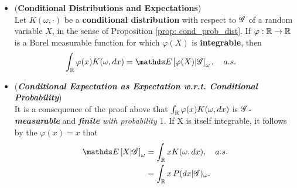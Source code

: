 \documentclass[11pt]{article}
\begin{document}
\begin{itemize}
\item \begin{proposition} (\textbf{Conditional Distributions and Expectations}) \citep{billingsley2008probability}\\
Let $K(\omega, \cdot)$ be a \textbf{conditional distribution} with respect to ${\mathscr G}$ of a random variable $X$, in the sense of Proposition \ref{prop: cond_prob_dist}. If $\varphi: {\mathbb R} \rightarrow {\mathbb R}$ is a Borel measurable function for which $\varphi(X)$ is \textbf{integrable}, then 
\begin{align*}
\int_{\bR} \varphi(x) K(\omega, dx) &= \E{}{\varphi(X) | \srG}_{\omega}, \quad a.s.
\end{align*}
\end{proposition}

\item \begin{remark} (\emph{\textbf{Conditional Expectation as Expectation w.r.t. Conditional Probability}})\\
It is a consequence of the proof above that $\int_{{\mathbb R}} \varphi(x) K(\omega, dx) $ is \emph{\textbf{${\mathscr G}$-measurable}} and \emph{\textbf{finite}} \emph{with probability $1$}. If X is itself integrable, it follows by the $\varphi(x) = x$ that 
\begin{align*}
 \E{}{X | \srG}_{\omega} &= \int_{\bR} x K(\omega, dx) , \quad a.s. \\
 &= \int_{\bR} x \,P(dx | \srG)_{\omega}.
\end{align*}
\end{remark}
\end{itemize}
\newpage


\end{document}
